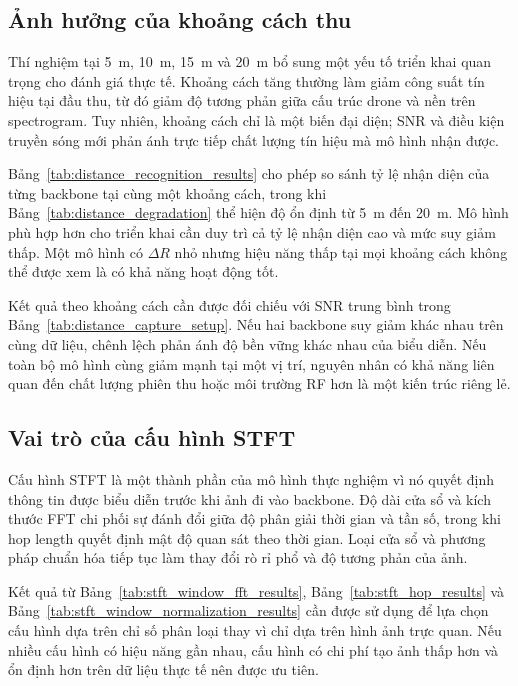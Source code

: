 \documentclass[../DoAn.tex]{subfiles}
\begin{document}
\subsection{Ảnh hưởng của khoảng cách thu}

Thí nghiệm tại 5~m, 10~m, 15~m và 20~m bổ sung một yếu tố triển khai quan trọng cho đánh giá thực tế. Khoảng cách tăng thường làm giảm công suất tín hiệu tại đầu thu, từ đó giảm độ tương phản giữa cấu trúc drone và nền trên spectrogram. Tuy nhiên, khoảng cách chỉ là một biến đại diện; SNR và điều kiện truyền sóng mới phản ánh trực tiếp chất lượng tín hiệu mà mô hình nhận được.

Bảng~\ref{tab:distance_recognition_results} cho phép so sánh tỷ lệ nhận diện của từng backbone tại cùng một khoảng cách, trong khi Bảng~\ref{tab:distance_degradation} thể hiện độ ổn định từ 5~m đến 20~m. Mô hình phù hợp hơn cho triển khai cần duy trì cả tỷ lệ nhận diện cao và mức suy giảm thấp. Một mô hình có $\Delta R$ nhỏ nhưng hiệu năng thấp tại mọi khoảng cách không thể được xem là có khả năng hoạt động tốt.

Kết quả theo khoảng cách cần được đối chiếu với SNR trung bình trong Bảng~\ref{tab:distance_capture_setup}. Nếu hai backbone suy giảm khác nhau trên cùng dữ liệu, chênh lệch phản ánh độ bền vững khác nhau của biểu diễn. Nếu toàn bộ mô hình cùng giảm mạnh tại một vị trí, nguyên nhân có khả năng liên quan đến chất lượng phiên thu hoặc môi trường RF hơn là một kiến trúc riêng lẻ.

\subsection{Vai trò của cấu hình STFT}

Cấu hình STFT là một thành phần của mô hình thực nghiệm vì nó quyết định thông tin được biểu diễn trước khi ảnh đi vào backbone. Độ dài cửa sổ và kích thước FFT chi phối sự đánh đổi giữa độ phân giải thời gian và tần số, trong khi hop length quyết định mật độ quan sát theo thời gian. Loại cửa sổ và phương pháp chuẩn hóa tiếp tục làm thay đổi rò rỉ phổ và độ tương phản của ảnh.

Kết quả từ Bảng~\ref{tab:stft_window_fft_results}, Bảng~\ref{tab:stft_hop_results} và Bảng~\ref{tab:stft_window_normalization_results} cần được sử dụng để lựa chọn cấu hình dựa trên chỉ số phân loại thay vì chỉ dựa trên hình ảnh trực quan. Nếu nhiều cấu hình có hiệu năng gần nhau, cấu hình có chi phí tạo ảnh thấp hơn và ổn định hơn trên dữ liệu thực tế nên được ưu tiên.
\end{document}
